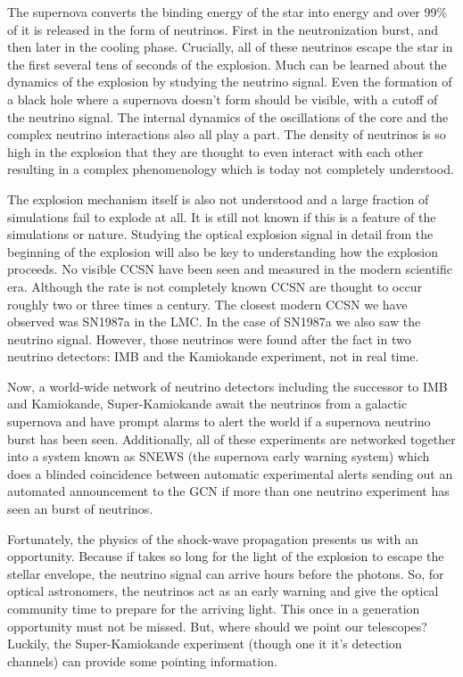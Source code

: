 \documentclass[11pt]{article}
\begin{document}
 The supernova converts the binding energy of the star into energy and
 over 99\% of it is released in the form of neutrinos. First in the
 neutronization burst, and then later in the cooling phase.  Crucially,
 all of these neutrinos escape the star in the first several tens of
 seconds of the explosion. Much can be learned about the dynamics of the
 explosion by studying the neutrino signal.  Even the formation of a
 black hole where a supernova doesn't form should be visible, with a
 cutoff of the neutrino signal.  The internal dynamics of the
 oscillations of the core and the complex neutrino interactions also
 all play a part. The density of neutrinos is so high in the explosion
 that they are thought to even interact with each other resulting in a
 complex phenomenology which is today not completely understood.

 The explosion mechanism itself is also not understood and a large
 fraction of simulations fail to explode at all.  It is still not
 known if this is a feature of the simulations or nature. Studying the
 optical explosion signal in detail from the beginning of the
 explosion will also be key to understanding how the explosion
 proceeds.  No visible CCSN have been seen and measured in the modern
 scientific era.  Although the rate is not completely known CCSN are
 thought to occur roughly two or three times a century.  The
 closest modern CCSN we have observed was SN1987a in the LMC.   In the
 case of SN1987a we also saw the neutrino signal. However, those
 neutrinos were found after the fact in two neutrino detectors: IMB and the
 Kamiokande experiment, not in real time.

Now, a world-wide network of neutrino detectors including the successor
to IMB and Kamiokande, Super-Kamiokande await the neutrinos from a
galactic supernova and have prompt alarms to alert the world if a
supernova neutrino burst has been seen.  Additionally, all of these
experiments are networked together into a system known as SNEWS (the
supernova early warning system) which does a blinded coincidence
between automatic experimental alerts sending out an automated
announcement to the GCN if more than one neutrino experiment has seen
an burst of neutrinos.

Fortunately, the physics of the shock-wave propagation presents us
with an opportunity.  Because if takes so long for the light of the
explosion to escape the stellar envelope, the neutrino signal can
arrive hours before the photons. So, for optical astronomers, the
neutrinos act as an early warning and give the optical community time
to prepare for the arriving light.  This once in a generation
opportunity must not be missed. But, where should we point our
telescopes?  Luckily, the Super-Kamiokande experiment (though one it
it's detection channels) can provide some pointing information.
\end{document}
